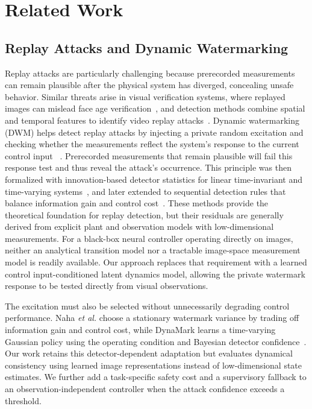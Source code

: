 \documentclass[letterpaper, 10 pt, conference]{ieeeconf}
\theoremstyle{plain}
\begin{document}
\section{Related Work}
\subsection{Replay Attacks and Dynamic Watermarking}
Replay attacks are particularly challenging because prerecorded measurements can remain plausible after the physical system has diverged, concealing unsafe behavior. Similar threats arise in visual verification systems, where replayed images can mislead face age verification~\cite{korshunov2024replay}, and detection methods combine spatial and temporal features to identify video replay attacks~\cite{khan2025spatiotemporal}. Dynamic watermarking (DWM) helps detect replay attacks by injecting a private random excitation and checking whether the measurements reflect the system’s response to the current control input ~\cite{mo2009secure}. Prerecorded measurements that remain plausible will fail this response test and thus reveal the attack's occurrence. This principle was then formalized with innovation-based detector statistics for linear time-invariant and time-varying systems~\cite{satchidanandan2017dynamic,porter2021generalized}, and later extended to sequential detection rules that balance information gain and control cost~\cite{naha2023sequential}. These methods provide the theoretical foundation for replay detection, but their residuals are generally derived from explicit plant and observation models with low-dimensional measurements. For a black-box neural controller operating directly on images, neither an analytical transition model nor a tractable image-space measurement model is readily available. Our approach replaces that requirement with a learned control input-conditioned latent dynamics model, allowing the private watermark response to be tested directly from visual observations.

The excitation must also be selected without unnecessarily degrading control performance. Naha \emph{et al.} choose a stationary watermark variance by trading off information gain and control cost, while DynaMark learns a time-varying Gaussian policy using the operating condition and Bayesian detector confidence~\cite{aftabi2025dynamark}. Our work retains this detector-dependent adaptation but evaluates dynamical consistency using learned image representations instead of low-dimensional state estimates. We further add a task-specific safety cost and a supervisory fallback to an observation-independent controller when the attack confidence exceeds a threshold.
\end{document}
